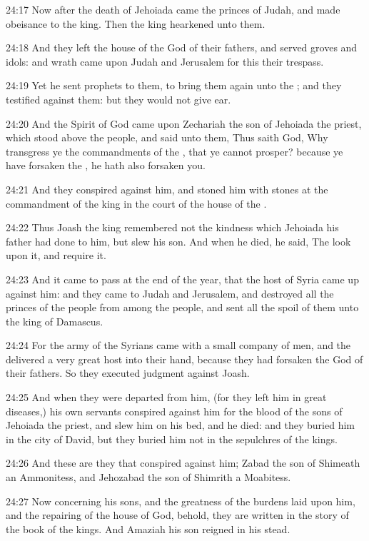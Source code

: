 24:17 Now after the death of Jehoiada came the princes of Judah, and made obeisance to the king. Then the king hearkened unto them.

24:18 And they left the house of the \LORD God of their fathers, and served groves and idols: and wrath came upon Judah and Jerusalem for this their trespass.

24:19 Yet he sent prophets to them, to bring them again unto the \LORD; and they testified against them: but they would not give ear.

24:20 And the Spirit of God came upon Zechariah the son of Jehoiada the priest, which stood above the people, and said unto them, Thus saith God, Why transgress ye the commandments of the \LORD, that ye cannot prosper? because ye have forsaken the \LORD, he hath also forsaken you.

24:21 And they conspired against him, and stoned him with stones at the commandment of the king in the court of the house of the \LORD.

24:22 Thus Joash the king remembered not the kindness which Jehoiada his father had done to him, but slew his son. And when he died, he said, The \LORD look upon it, and require it.

24:23 And it came to pass at the end of the year, that the host of Syria came up against him: and they came to Judah and Jerusalem, and destroyed all the princes of the people from among the people, and sent all the spoil of them unto the king of Damascus.

24:24 For the army of the Syrians came with a small company of men, and the \LORD delivered a very great host into their hand, because they had forsaken the \LORD God of their fathers. So they executed judgment against Joash.

24:25 And when they were departed from him, (for they left him in great diseases,) his own servants conspired against him for the blood of the sons of Jehoiada the priest, and slew him on his bed, and he died: and they buried him in the city of David, but they buried him not in the sepulchres of the kings.

24:26 And these are they that conspired against him; Zabad the son of Shimeath an Ammonitess, and Jehozabad the son of Shimrith a Moabitess.

24:27 Now concerning his sons, and the greatness of the burdens laid upon him, and the repairing of the house of God, behold, they are written in the story of the book of the kings. And Amaziah his son reigned in his stead.

